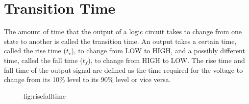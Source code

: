 \section{Transition Time}

The amount of time that the output of a logic circuit 
takes to change from one
state to another is called the transition time. 
An output takes a certain time, called the rise time
($t_r$), to change from LOW to HIGH, and a 
possibly different time, called the fall
time ($t_f$), to change from HIGH to LOW.
The rise time and fall time of the output signal are defined as the time 
required for the voltage to change from its 10\% level to its 90\% level 
or vice versa. 

\begin{figure}
    \centering 
    \label{Rise and Fall Time}
    \caption{fig:risefalltime}
\end{figure}